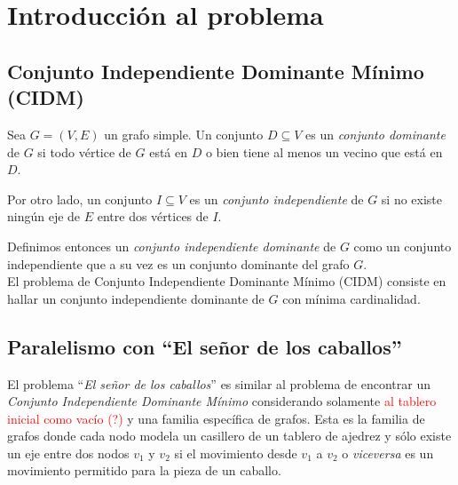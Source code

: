 \section{Introducci\'on al problema}
\subsection{Conjunto Independiente Dominante M\'inimo (CIDM)}

Sea $G = (V, E)$ un grafo simple. Un conjunto $D \subseteq V$ es un \emph{conjunto dominante} de $G$ si todo v\'ertice de $G$ est\'a en $D$ o bien tiene al menos un vecino que est\'a en $D$. 

Por otro lado, un conjunto $I \subseteq V$ es un \emph{conjunto independiente} de $G$ si no existe ning\'un eje de $E$ entre dos v\'ertices de $I$. 

Definimos entonces un \emph{conjunto independiente dominante} de $G$ como un conjunto independiente que a su vez es un conjunto dominante del grafo $G$.\\

El problema de Conjunto Independiente Dominante M\'inimo (CIDM) consiste en hallar un conjunto independiente dominante de $G$ con m\'inima cardinalidad.

\subsection{Paralelismo con ``El se\~nor de los caballos''}\label{caballitos}

El problema ``\emph{El se\~nor de los caballos}'' es similar al problema de encontrar un \emph{Conjunto Independiente Dominante M\'inimo} considerando solamente \textcolor{red}{al tablero inicial como vacío (?)} y una familia específica de grafos. Esta es la familia de grafos donde cada nodo modela un casillero de un tablero de ajedrez y sólo existe un eje entre dos nodos $v_1$ y $v_2$ si el movimiento desde $v_1$ a $v_2$ o \textit{viceversa} es un movimiento permitido para la pieza de un caballo.\\

